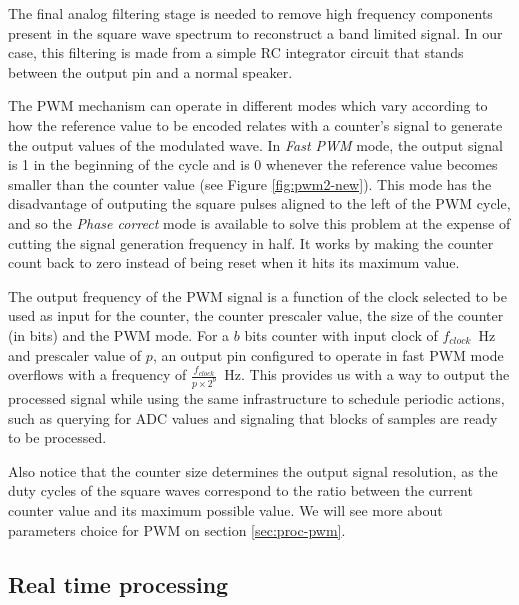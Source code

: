 
The final analog filtering stage is needed to remove high frequency components
present in the square wave spectrum to reconstruct a band limited signal. In our case,
this filtering is made from a simple RC integrator circuit that stands between the output
pin and a normal speaker.

The PWM mechanism can operate in different modes which vary according to how
the reference value to be encoded relates with a counter's signal to generate
the output values of the modulated wave. In \emph{Fast PWM} mode, the output
signal is 1 in the beginning of the cycle and is 0 whenever the
reference value becomes smaller than the counter value (see Figure
\ref{fig:pwm2-new}). This mode has the disadvantage of outputing the square pulses
aligned to the left of the PWM cycle, and so the \emph{Phase correct} mode is
available to solve this problem at the expense of cutting the signal
generation frequency in half. It works by making the counter count back to
zero instead of being reset when it hits its maximum value.


The output frequency of the PWM signal is a function of the clock selected to be
used as input for the counter, the counter prescaler value, the size of the
counter (in bits) and the PWM mode. For a $b$ bits counter with input clock of
$f_{clock}$~Hz and prescaler value of $p$, an output pin configured to operate
in fast PWM mode overflows with a frequency of $\frac{f_{clock}}{p \times
2^b}$~Hz. This provides us with a way to output the processed signal while
using the same infrastructure to schedule periodic actions, such as querying
for ADC values and signaling that blocks of samples are ready to be processed.

Also notice that the counter size determines the output signal resolution, as
the duty cycles of the square waves correspond to the ratio between the
current counter value and its maximum possible value. We will see more about
parameters choice for PWM on section \ref{sec:proc-pwm}.

\subsection{Real time processing}

